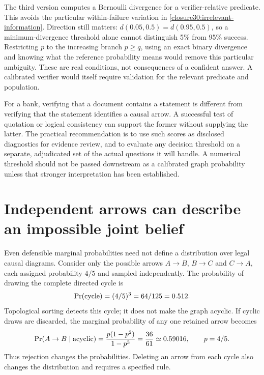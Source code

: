 The third version computes a Bernoulli divergence for a verifier-relative
predicate. This avoids the particular within-failure variation in
\eqref{closure30:irrelevant-information}. Direction still matters:
$d(0.05,0.5)=d(0.95,0.5)$, so a minimum-divergence threshold alone cannot
distinguish 5\% from 95\% success. Restricting $p$ to the increasing branch
$p\geq q$, using an exact binary divergence and knowing what the reference
probability means would remove this particular ambiguity. These are real
conditions, not consequences of a confident answer. A calibrated verifier
would itself require validation for the relevant predicate and population.
\citep[Sections 3.5--3.6, Algorithm 1 and Appendix A.5]
{closure30chlonthree}

For a bank, verifying that a document contains a statement is different from
verifying that the statement identifies a causal arrow. A successful test of
quotation or logical consistency can support the former without supplying
the latter. The practical recommendation is to use such scores as disclosed
diagnostics for evidence review, and to evaluate any decision threshold on a
separate, adjudicated set of the actual questions it will handle. A numerical
threshold should not be passed downstream as a calibrated graph probability
unless that stronger interpretation has been established.

\section{Independent arrows can describe an impossible joint belief}

Even defensible marginal probabilities need not define a distribution over
legal causal diagrams. Consider only the possible arrows
$A\to B$, $B\to C$ and $C\to A$, each assigned probability $4/5$ and sampled
independently. The probability of drawing the complete directed cycle is
\begin{equation}
 \Pr(\hbox{cycle})=(4/5)^3=64/125=0.512.
 \label{closure30:cycle-probability}
\end{equation}
Topological sorting detects this cycle; it does not make the graph acyclic.
If cyclic draws are discarded, the marginal probability of any one retained
arrow becomes
\begin{equation}
 \Pr(A\to B\mid\hbox{acyclic})
 =\frac{p(1-p^2)}{1-p^3}
 =\frac{36}{61}\simeq0.59016,\qquad p=4/5.
 \label{closure30:cycle-conditioning}
\end{equation}
Thus rejection changes the probabilities. Deleting an arrow from each cycle
also changes the distribution and requires a specified rule.


